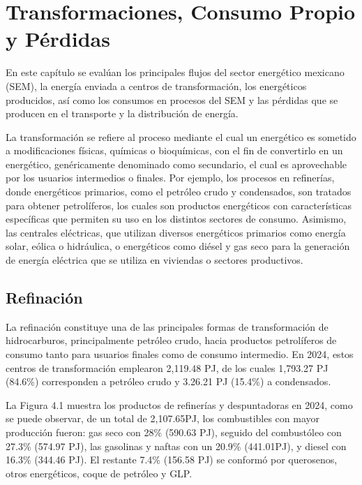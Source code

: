 \documentclass{sener2025}
\begin{document}

\section{Transformaciones, Consumo Propio y Pérdidas}

En este capítulo se evalúan los principales flujos del sector energético mexicano (SEM), la energía enviada a centros de transformación, los energéticos producidos, así como los consumos en procesos del SEM y las pérdidas que se producen en el transporte y la distribución de energía.

La transformación se refiere al proceso mediante el cual un energético es sometido a modificaciones físicas, químicas o bioquímicas, con el fin de convertirlo en un energético, genéricamente denominado como secundario, el cual es aprovechable por los usuarios intermedios o finales. Por ejemplo, los procesos en refinerías, donde energéticos primarios, como el petróleo crudo y condensados, son tratados para obtener petrolíferos, los cuales son productos energéticos con características específicas que permiten su uso en los distintos sectores de consumo. Asimismo, las centrales eléctricas, que utilizan diversos energéticos primarios como energía solar, eólica o hidráulica, o energéticos como diésel y gas seco para la generación de energía eléctrica que se utiliza en viviendas o sectores productivos.


\subsection{Refinación}

La refinación constituye una de las principales formas de transformación de hidrocarburos, principalmente petróleo crudo, hacia productos petrolíferos de consumo tanto para usuarios finales como de consumo intermedio. En 2024, estos centros de transformación emplearon 2,119.48 PJ, de los cuales 1,793.27 PJ (84.6\%) corresponden a petróleo crudo y 3.26.21 PJ (15.4\%) a condensados.

La Figura 4.1 muestra los productos de refinerías y despuntadoras en 2024, como se puede observar, de un total de 2,107.65PJ, los combustibles con mayor producción fueron: gas seco con 28\% (590.63 PJ), seguido del combustóleo con 27.3\% (574.97 PJ), las gasolinas y naftas con un 20.9\% (441.01PJ), y diesel con 16.3\% (344.46 PJ). El restante 7.4\% (156.58 PJ) se conformó por querosenos, otros energéticos, coque de petróleo y GLP.
\end{document}
